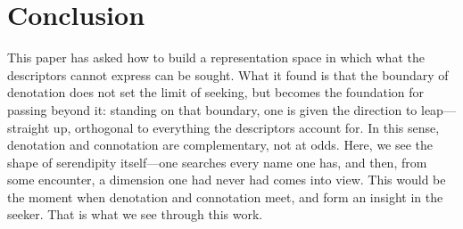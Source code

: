 \section{Conclusion}\label{sec:conclusion}

This paper has asked how to build a representation space in which what
the descriptors cannot express can be sought. What it found is that the
boundary of denotation does not set the limit of seeking, but becomes
the foundation for passing beyond it: standing on that boundary, one is
given the direction to leap---straight up, orthogonal to everything the
descriptors account for. In this sense, denotation and connotation are
complementary, not at odds. Here, we see the shape of serendipity
itself---one searches every name one has, and then, from some
encounter, a dimension one had never had comes into view. This would be
the moment when denotation and connotation meet, and form an insight in
the seeker. That is what we see through this work.
